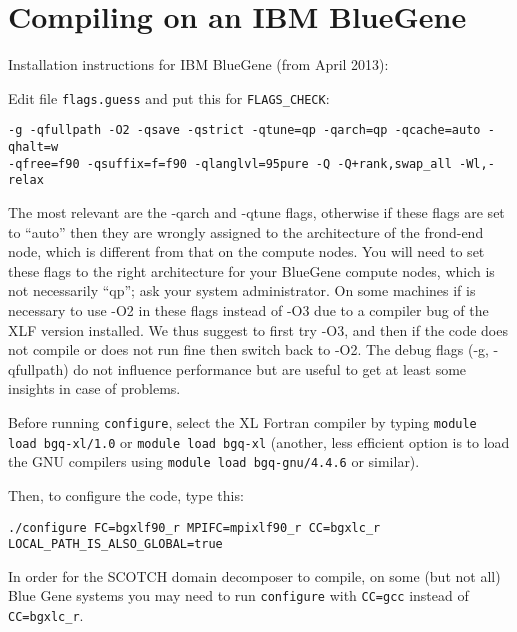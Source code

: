 \section{Compiling on an IBM BlueGene}

\noindent
Installation instructions for IBM BlueGene (from April 2013):\newline


\noindent Edit file \texttt{flags.guess} and put this for \texttt{FLAGS\_CHECK}:
\begin{verbatim}
-g -qfullpath -O2 -qsave -qstrict -qtune=qp -qarch=qp -qcache=auto -qhalt=w
-qfree=f90 -qsuffix=f=f90 -qlanglvl=95pure -Q -Q+rank,swap_all -Wl,-relax
\end{verbatim}

\noindent The most relevant are the -qarch and -qtune flags, otherwise
if these flags are set to ``auto'' then they are wrongly assigned
to the architecture of the frond-end node, which is different from
that on the compute nodes. You will need to set these flags to the
right architecture for your BlueGene compute nodes, which is not necessarily
``qp''; ask your system administrator. On some machines if is necessary
to use -O2 in these flags instead of -O3 due to a compiler bug of
the XLF version installed. We thus suggest to first try -O3, and then
if the code does not compile or does not run fine then switch back
to -O2. The debug flags (-g, -qfullpath) do not influence performance
but are useful to get at least some insights in case of problems.\newline


\noindent Before running \texttt{configure}, select the XL Fortran
compiler by typing \texttt{module load bgq-xl/1.0} or \texttt{module
load bgq-xl} (another, less efficient option is to load the GNU compilers
using \texttt{module load bgq-gnu/4.4.6} or similar).\newline


\noindent Then, to configure the code, type this:
\begin{verbatim}
./configure FC=bgxlf90_r MPIFC=mpixlf90_r CC=bgxlc_r LOCAL_PATH_IS_ALSO_GLOBAL=true
\end{verbatim}

In order for the SCOTCH domain decomposer to compile, on some (but
not all) Blue Gene systems you may need to run \texttt{configure}
with \texttt{CC=gcc} instead of \texttt{CC=bgxlc\_r}.

